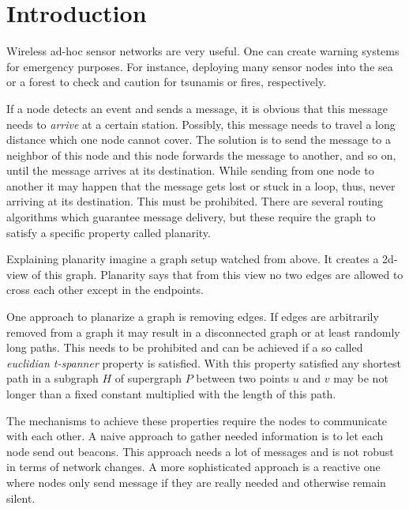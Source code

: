 \section{Introduction}
Wireless ad-hoc sensor networks are very useful. 
One can create warning systems for emergency purposes.
For instance, deploying many sensor nodes into the sea or a forest to check and caution for tsunamis or fires, respectively.

If a node detects an event and sends a message, it is obvious that this message needs to \emph{arrive} at a certain station.
Possibly, this message needs to travel a long distance which one node cannot cover.
The solution is to send the message to a neighbor of this node and this node forwards the message to another, and so on, until the message arrives at its destination.
While sending from one node to another it may happen that the message gets lost or stuck in a loop, thus, never arriving at its destination.
This must be prohibited.
There are several routing algorithms which guarantee message delivery, but these require the graph to satisfy a specific property called planarity.

Explaining planarity imagine a graph setup watched from above. 
It creates a 2d-view of this graph.
Planarity says that from this view no two edges are allowed to cross each other except in the endpoints.

One approach to planarize a graph is removing edges.
If edges are arbitrarily removed from a graph it may result in a disconnected graph or at least randomly long paths.
This needs to be prohibited and can be achieved if a so called \emph{euclidian t-spanner} property is satisfied.
With this property satisfied any shortest path in a subgraph $H $ of supergraph $P $ between two points $u $ and $v $ may be not longer than a fixed constant multiplied with the length of this path.

The mechanisms to achieve these properties require the nodes to communicate with each other.
A naive approach to gather needed information is to let each node send out beacons.
This approach needs a lot of messages and is not robust in terms of network changes.
A more sophisticated approach is a reactive one where nodes only send message if they are really needed and otherwise remain silent. 

